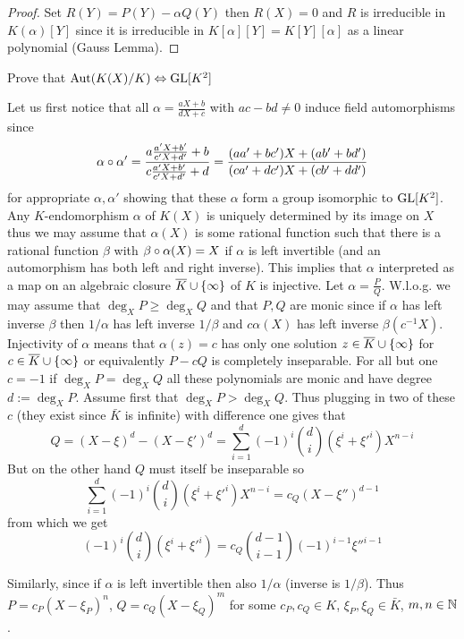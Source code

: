 \documentclass[8pt,a4paper]{article}
\begin{document}
\begin{proof}
    Set $R(Y)=P(Y)-\alpha Q(Y)$ then $R(X)=0$ and $R$ is irreducible in $K(\alpha)[Y]$ since it is irreducible in $K[\alpha][Y]=K[Y][\alpha]$ as a linear polynomial (Gauss Lemma).
\end{proof}
    
\begin{exercise}
    Prove that $\mathop\mathrm{Aut}\nolimits(K(X)/K)\Leftrightarrow \mathrm{GL}[K^2]$
\end{exercise}

\begin{solution}    
    Let us first notice that all $\alpha=\frac{aX+b}{dX+c}$ with $ac-bd\neq 0$ induce field automorphisms since $$\alpha\circ\alpha'=\frac{a\frac{a'X+b'}{c'X+d'}+b}{c\frac{a'X+b'}{c'X+d'}+d}=\frac{(aa'+bc')X+(ab'+bd')}{(ca'+dc')X+(cb'+dd')}$$for appropriate $\alpha,\alpha'$ showing that these $\alpha$ form a group isomorphic to $\mathrm{GL}[K^2]$.
    Any $K$-endomorphism $\alpha$ of $K(X)$ is uniquely determined by its image on $X$ thus we may assume that
    $\alpha(X)$ is some rational function such that there is a rational function $\beta$ with $\beta\circ\alpha(X)=X$ if $\alpha$ is left invertible (and an automorphism has both left and right inverse). This implies that $\alpha$ interpreted as a map on an algebraic closure $\bar{K}\setjoin\set{\infty}$ of $K$ is injective.
    Let $\alpha=\frac{P}{Q}$. W.l.o.g. we may assume that $\deg_X{P}\geq\deg_X{Q}$ and that $P,Q$ are monic since if $\alpha$ has left inverse $\beta$ then $1/\alpha$ has left inverse $1/\beta$ and $c\alpha(X)$ has left inverse $\beta(c^{-1}X)$.
    Injectivity of $\alpha$ means that $\alpha(z)=c$ has only one solution $z\in \bar{K}\setjoin\set{\infty}$ for $c\in\bar{K}\setjoin\set{\infty}$ or equivalently $P-cQ$ is completely inseparable. For all but one $c=-1$ if $\deg_X{P}=\deg_X{Q}$ all these polynomials are monic and have degree $d:=\deg_X{P}$.
    Assume first that $\deg_X{P}>\deg_X{Q}$. Thus plugging in two of these $c$ (they exist since $\bar{K}$ is infinite) with difference one gives that
    $$Q={(X-\xi)}^d-{(X-\xi')}^d=\sum_{i=1}^d{{(-1)}^i\binom{d}{i}(\xi^i+{\xi'}^i)X^{n-i}}$$
    But on the other hand $Q$ must itself be inseparable so
    $$\sum_{i=1}^d{{(-1)}^i\binom{d}{i}(\xi^i+{\xi'}^i)X^{n-i}}=c_Q{(X-{\xi''})}^{d-1}$$
    from which we get
    $${(-1)}^i\binom{d}{i}(\xi^i+{\xi'}^i)=c_Q\binom{d-1}{i-1}{(-1)}^{i-1}{\xi''}^{i-1}$$

   
Similarly, since if $\alpha$ is left invertible then also $1/\alpha$ (inverse is $1/\beta$). Thus $P=c_P(X-\xi_P)^n$, $Q=c_Q(X-\xi_Q)^m$ for some $c_P,c_Q\in K$, $\xi_P,\xi_Q\in\bar{K}$, $m,n\in\mathbb{N}$. 
\end{solution}
\end{document}
